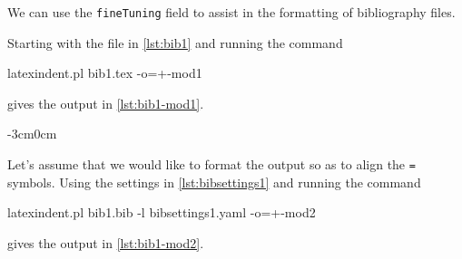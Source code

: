 \documentclass[10pt]{article}
\newenvironment{widepage}{\begin{adjustwidth}{-3cm}{0cm}}{\end{adjustwidth}}
\begin{document}
 \begin{example}
 We can use the \texttt{fineTuning} field to assist in the formatting of bibliography
 files.  
   

 Starting with the file in \cref{lst:bib1} and running the command

 \begin{commandshell}
latexindent.pl bib1.tex -o=+-mod1 
   \end{commandshell}

 gives the output in \cref{lst:bib1-mod1}.

 \begin{widepage}
  \begin{cmhtcbraster}[raster column skip=.01\linewidth]
  \end{cmhtcbraster}
 \end{widepage}

 Let's assume that we would like to format the output so as to align the \texttt{=}
 symbols. Using the settings in \cref{lst:bibsettings1} and running the command

 \begin{commandshell}
latexindent.pl bib1.bib -l bibsettings1.yaml -o=+-mod2 
     \end{commandshell}

 gives the output in \cref{lst:bib1-mod2}.


\end{example}
\end{document}
